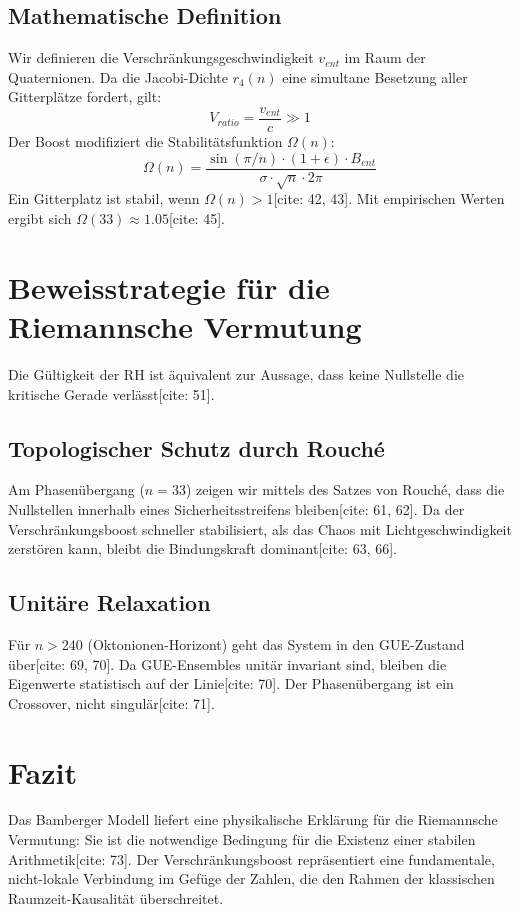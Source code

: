 \documentclass[11pt,a4paper]{article}
\begin{document}
	\subsection{Mathematische Definition}
	Wir definieren die Verschränkungsgeschwindigkeit $v_{ent}$ im Raum der Quaternionen. Da die Jacobi-Dichte $r_4(n)$ eine simultane Besetzung aller Gitterplätze fordert, gilt:
	\begin{equation}
		V_{ratio} = \frac{v_{ent}}{c} \gg 1
	\end{equation}
	Der Boost modifiziert die Stabilitätsfunktion $\Omega(n)$:
	\begin{equation}
		\Omega(n)=\frac{\sin(\pi/n)\cdot(1+\epsilon)\cdot B_{ent}}{\sigma\cdot\sqrt{n}\cdot2\pi}
	\end{equation}
	Ein Gitterplatz ist stabil, wenn $\Omega(n) > 1$[cite: 42, 43]. Mit empirischen Werten ergibt sich $\Omega(33)\approx1.05$[cite: 45].
	
	\section{Beweisstrategie für die Riemannsche Vermutung}
	Die Gültigkeit der RH ist äquivalent zur Aussage, dass keine Nullstelle die kritische Gerade verlässt[cite: 51].
	
	\subsection{Topologischer Schutz durch Rouché}
	Am Phasenübergang ($n=33$) zeigen wir mittels des Satzes von Rouché, dass die Nullstellen innerhalb eines Sicherheitsstreifens bleiben[cite: 61, 62]. Da der Verschränkungsboost schneller stabilisiert, als das Chaos mit Lichtgeschwindigkeit zerstören kann, bleibt die Bindungskraft dominant[cite: 63, 66].
	
	\subsection{Unitäre Relaxation}
	Für $n > 240$ (Oktonionen-Horizont) geht das System in den GUE-Zustand über[cite: 69, 70]. Da GUE-Ensembles unitär invariant sind, bleiben die Eigenwerte statistisch auf der Linie[cite: 70]. Der Phasenübergang ist ein Crossover, nicht singulär[cite: 71].
	
	\section{Fazit}
	Das Bamberger Modell liefert eine physikalische Erklärung für die Riemannsche Vermutung: Sie ist die notwendige Bedingung für die Existenz einer stabilen Arithmetik[cite: 73]. Der Verschränkungsboost repräsentiert eine fundamentale, nicht-lokale Verbindung im Gefüge der Zahlen, die den Rahmen der klassischen Raumzeit-Kausalität überschreitet.
	
\end{document}
